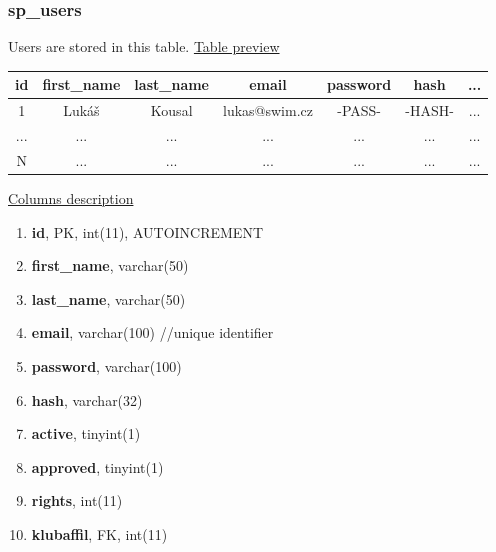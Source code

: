 \subsubsection*{sp\_users}
Users are stored in this table.
\newline
\underline{Table preview}
\begin{center}
  \begin{tabular}{||c c c c c c c||} 
  \hline
  id & first\_name & last\_name & email & password & hash & ... \\ [0.5ex] 
  \hline\hline
  1 & Lukáš & Kousal & lukas@swim.cz & -PASS- & -HASH- & ... \\ 
  \hline
  ... & ... & ... & ... & ... & ... & ... \\
  \hline
  N & ... & ... & ... & ... & ... & ... \\ 
  \hline
 \end{tabular}
 \end{center}
 \underline{Columns description}
 \begin{enumerate}
   \setlength\itemsep{0em}
   \item \textbf{id}, PK, int(11), AUTOINCREMENT
   \item \textbf{first\_name}, varchar(50)
   \item \textbf{last\_name}, varchar(50)
   \item \textbf{email}, varchar(100) //unique identifier
   \item \textbf{password}, varchar(100)
   \item \textbf{hash}, varchar(32)
   \item \textbf{active}, tinyint(1)
   \item \textbf{approved}, tinyint(1)
   \item \textbf{rights}, int(11)
   \item \textbf{klubaffil}, FK, int(11)
\end{enumerate}

